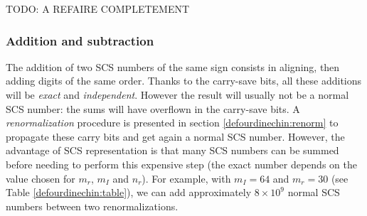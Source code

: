 TODO:
A REFAIRE COMPLETEMENT


\subsubsection{Addition and subtraction}

The addition of two SCS numbers of the same sign consists in
aligning, then adding digits of the same order. Thanks to the
carry-save bits, all these additions will be \emph{exact} and
\emph{independent}.  However the result will usually not be a normal
SCS number: the sums will have overflown in the carry-save bits. A
\emph{renormalization} procedure is presented in section \ref{defourdinechin:renorm}
to propagate these carry bits and get again a normal SCS number.
However, the advantage of SCS representation is that many SCS
numbers can be summed before needing to perform this expensive step
(the exact number depends on the value chosen for $m_r$, $m_I$ and
$n_r$). For example, with $m_I=64$ and $m_r=30$ (see
Table \ref{defourdinechin:table}), we can add approximately $8 \times 10^{9}$
normal SCS numbers between two renormalizations. 

